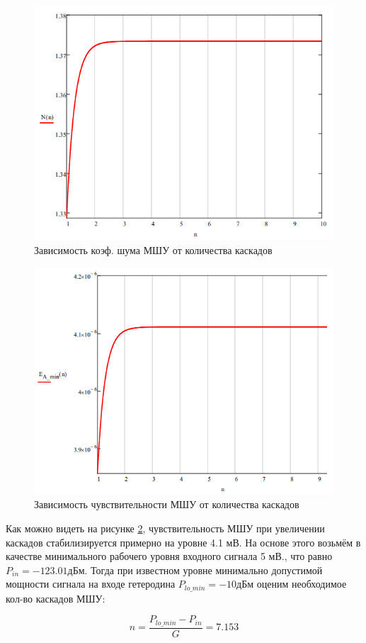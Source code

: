 \documentclass[utf8x, 14pt, oneside, a4paper]{article}
\begin{document}
				\begin{figure}[H]
					\centering
					\includegraphics[width=0.7\linewidth]{"Рисунки/Графики/Коэффициент шума"}
					\caption{Зависимость коэф. шума МШУ от количества каскадов}
					\label{fig:graf:N}
				\end{figure}
			
				\begin{figure}[H]
					\centering
					\includegraphics[width=0.7\linewidth]{"Рисунки/Графики/Чувствительность"}
					\caption{Зависимость чувствительности МШУ от количества каскадов}
					\label{fig:graf:Chyvstvit}
				\end{figure}
			
				Как можно видеть на рисунке \ref{fig:graf:Chyvstvit}, чувствительность МШУ при увеличении каскадов стабилизируется примерно на уровне 4.1 мВ. На основе этого возьмём в качестве минимального рабочего уровня входного сигнала 5 мВ., что равно $P_{in}=-123.01 \text{дБм}$. Тогда при известном уровне минимально допустимой мощности сигнала на входе гетеродина $P_{lo\_min}=-10 \text{дБм}$ оценим необходимое кол-во каскадов МШУ:
				
				\begin{equation}
					\label{eq:n_LNA}
					n=\frac{P_{lo\_min}-P_{in}}{G}=7.153
				\end{equation}
			
\end{document}
